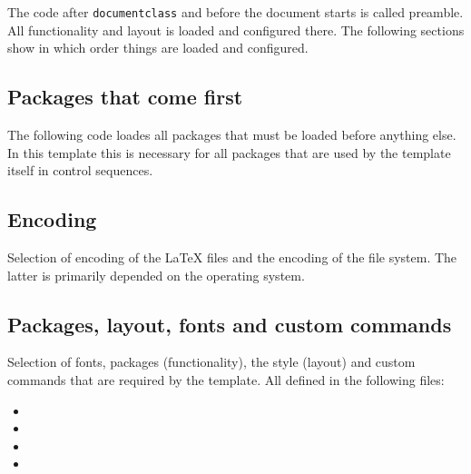 The code after \texttt{documentclass} and before the document starts is called preamble. All functionality and layout is loaded and configured there. The following sections show in which order things are loaded and configured.

\subsection{Packages that come first}
\label{sec:preamble:firstpackages}

The following code loades all packages that must be loaded before anything else. In this template this is necessary for all packages that are used by the template itself in control sequences.

\subsection{Encoding}
\label{sec:preamble:encoding}

Selection of encoding of the LaTeX files and the encoding of the file system. The latter is primarily depended on the operating system.

\subsection{Packages, layout, fonts and custom commands}
\label{sec:preamble:packages}

Selection of fonts, packages (functionality), the style (layout) and custom 
commands that are required by the template. All defined in the following files:
%
\begin{itemize}[noitemsep]
\item {}
\item {}
\item {}
\item {}
\end{itemize}


